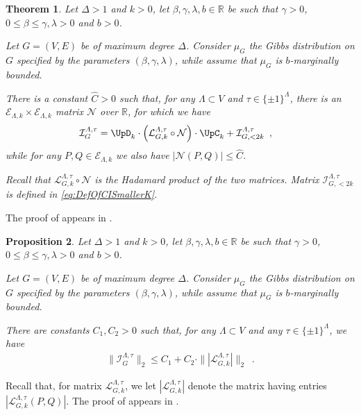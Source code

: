 \documentclass[11pt,reqno]{amsart}
\numberwithin{equation}{section}
\newtheorem{theorem}{Theorem}[section]
\newtheorem{proposition}[theorem]{Proposition}
\newcommand{\cE}{{\mathcal{E}}}
\newcommand{\cI}{{\mathcal{I}}}
\newcommand{\cL}{{\mathcal{L}}}
\newcommand{\cN}{{\mathcal{N}}}
\newcommand{\applegreen}[1]{ {\color{applegreen}#1}}
\newcommand{\amethyst}[1]{{\color{amethyst}#1} }
\newcommand{\blue}[1]{{\color{blue}#1}}
\newcommand{\bluepigment}[1]{{\color{blue(pigment)}#1}}
\newcommand{\deeppink}[1]{{\color{deeppink}#1}}
\newcommand{\goldenbrown}[1]{{\color{goldenbrown}#1}}
\newcommand{\iris}[1]{{\color{iris}#1}}
\newcommand{\maxDeg}{{\Delta}}
\newcommand{\ExtV}{\iris{\cE}}
\newcommand{\infmatrix}{\cI}
\newcommand{\norm}[2]{\goldenbrown{\|} #1 \goldenbrown{\|}_{#2}}
\newcommand{\abs}[1]{\blue{|}#1\blue{|}}
\newcommand{\VToEdge}{\UpD}
\newcommand{\EdgeToV}{\UpC}
\renewcommand{\applegreen}[1]{#1}
\renewcommand{\amethyst}[1]{#1}
\renewcommand{\blue}[1]{#1}
\renewcommand{\bluepigment}[1]{#1}
\renewcommand{\deeppink}[1]{#1}
\renewcommand{\goldenbrown}[1]{#1}
\renewcommand{\iris}[1]{#1}
\newcommand{\kC}{\deeppink{C}}
\newcommand{\kk}{\bluepigment{k}}
\newcommand{\kP}{\goldenbrown{P}}
\newcommand{\kQ}{\amethyst{Q}}
\renewcommand{\kC}{C}
\renewcommand{\kk}{k}
\renewcommand{\kP}{P}
\renewcommand{\kQ}{Q}
\newcommand{\ExtdInfMatrixF}{\applegreen{\cL}^{\Lambda,\tau}_{G,\kk}}
\newcommand{\SymWeightM}{\cN}
\begin{document}
\begin{theorem}\label{thrm:InflVsExtInfl}
Let $\maxDeg> 1$ and $\kk> 0$, let $\beta,\gamma, \lambda, b \in \mathbb{R}$ be such that $\gamma >0$,
$0\leq \beta\leq \gamma, \lambda>0$ and $b>0$. 

Let $G=(V,E)$ be of maximum degree $\maxDeg$. Consider $\mu_G$ the Gibbs distribution on $G$ 
specified by the parameters $(\beta, \gamma, \lambda)$, 
while assume that $\mu_G$ is $b$-marginally
bounded.

There is a constant $\widehat{\kC}>0$ such that, for any $\Lambda\subset V$ and $\tau\in \{\pm 1\}^{\Lambda}$, 
there is an $\ExtV_{\Lambda,k}\times \ExtV_{\Lambda, k }$ matrix $\SymWeightM$ over $\mathbb{R}$, 
for which we have
%
\begin{align}\label{eq:thrm:InflVsExtInfl}
 \infmatrix^{\Lambda,\tau}_G& =\VToEdge_{\kk} \cdot \left( \ExtdInfMatrixF\circ \SymWeightM \right )\cdot \EdgeToV_{\kk}
+ \infmatrix^{\Lambda,\tau}_{G, <2\kk} \enspace, 
\end{align}
while for any $\kP,\kQ\in \ExtV_{\Lambda,\kk}$ we also have $\abs{\SymWeightM(\kP,\kQ)}  \leq \widehat{\kC}$.


Recall that $\ExtdInfMatrixF\circ \SymWeightM$ is the Hadamard product of the two matrices. 
Matrix $\infmatrix^{\Lambda,\tau}_{G, <2\kk}$ is defined in \eqref{eq:DefOfCISmallerK}. 
\end{theorem}

The proof of  appears in .


\begin{proposition}\label{proposition:CINorm2VsCLNorm2}
Let $\maxDeg> 1$ and $k> 0$, let $\beta,\gamma, \lambda, b \in \mathbb{R}$ be such that $\gamma >0$,
$0\leq \beta\leq \gamma, \lambda>0$ and $b>0$. 

Let $G=(V,E)$ be of maximum degree $\maxDeg$. Consider $\mu_G$ the Gibbs distribution on $G$ 
specified by the parameters $(\beta, \gamma, \lambda)$, 
while assume that $\mu_G$ is $b$-marginally
bounded.

There are constants $C_1, C_2>0$ such that, for any $\Lambda\subset V$ and any $\tau\in \{\pm 1\}^{\Lambda}$, 
we have
\begin{align}\nonumber
\norm{ \infmatrix^{\Lambda,\tau}_G}{2}  \leq C_1+ C_2 \cdot \norm{ \abs{\ExtdInfMatrixF}}{2} \enspace.
\end{align}
\end{proposition}


Recall that, for matrix $\ExtdInfMatrixF$, we let $\abs{\ExtdInfMatrixF}$ denote the matrix 
having entries $\abs{\ExtdInfMatrixF(\kP,\kQ)}$.
%
The proof of  appears in . 
\end{document}
